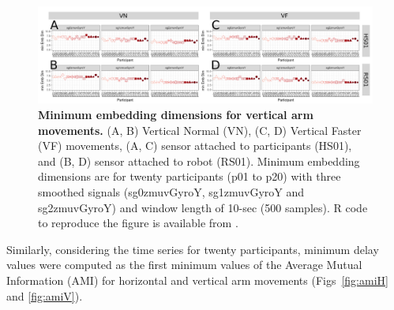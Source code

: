 \begin{figure}[!h]
\centering
\includegraphics[width=1.0\textwidth]{cao_aVw10}
	\caption{
	{\bf Minimum embedding dimensions for vertical arm movements.} 
		(A, B) Vertical Normal (VN), (C, D) Vertical Faster (VF) movements,
		(A, C) sensor attached to participants (HS01), and		
		(B, D) sensor attached to robot (RS01).
		Minimum embedding dimensions are for twenty participants (p01 to p20) with
		three smoothed signals (sg0zmuvGyroY, sg1zmuvGyroY and sg2zmuvGyroY) 
		and window length of 10-sec (500 samples).
		R code to reproduce the figure is available from \cite{hwum2018}.
        }
    \label{fig:caoV}
\end{figure}



Similarly, considering the time series for twenty participants,
minimum delay values were computed as the first minimum values of the  
Average Mutual Information (AMI) for 
horizontal and vertical arm movements (Figs~\ref{fig:amiH} and \ref{fig:amiV}).

